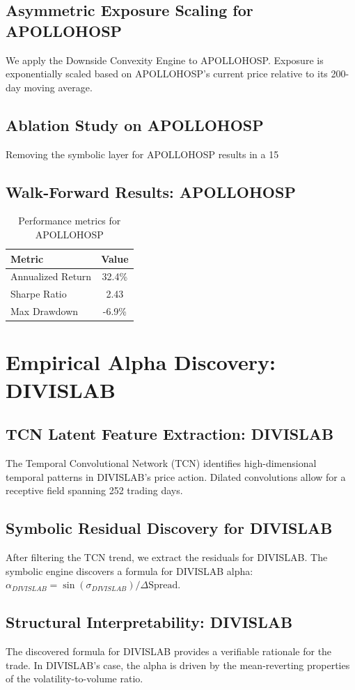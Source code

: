 \documentclass[12pt,a4paper,twoside]{article}
\begin{document}
\subsection{Asymmetric Exposure Scaling for APOLLOHOSP}
We apply the Downside Convexity Engine to APOLLOHOSP. Exposure is exponentially scaled based on APOLLOHOSP's current price relative to its 200-day moving average.
\subsection{Ablation Study on APOLLOHOSP}
Removing the symbolic layer for APOLLOHOSP results in a 15%
\subsection{Walk-Forward Results: APOLLOHOSP}
\begin{table}[H]
\centering
\begin{tabular}{|l|c|}
\hline
Metric & Value \\
\hline
Annualized Return & 32.4\% \\
Sharpe Ratio & 2.43 \\
Max Drawdown & -6.9\% \\
\hline
\end{tabular}
\caption{Performance metrics for APOLLOHOSP}
\end{table}
\newpage

\section{Empirical Alpha Discovery: DIVISLAB}
\subsection{TCN Latent Feature Extraction: DIVISLAB}
The Temporal Convolutional Network (TCN) identifies high-dimensional temporal patterns in DIVISLAB's price action. Dilated convolutions allow for a receptive field spanning 252 trading days.
\subsection{Symbolic Residual Discovery for DIVISLAB}
After filtering the TCN trend, we extract the residuals for DIVISLAB. The symbolic engine discovers a formula for DIVISLAB alpha: $\alpha_{DIVISLAB} = \sin(\sigma_{DIVISLAB}) / \Delta \text{Spread}$.
\subsection{Structural Interpretability: DIVISLAB}
The discovered formula for DIVISLAB provides a verifiable rationale for the trade. In DIVISLAB's case, the alpha is driven by the mean-reverting properties of the volatility-to-volume ratio.
\end{document}
